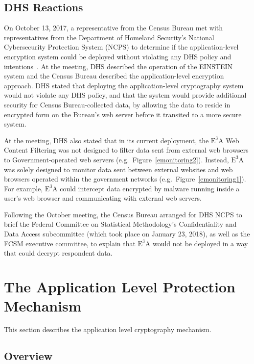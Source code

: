 \documentclass[fleqn,12pt]{wlscirep}
\newcommand{\ETA}{$\textrm{E}^\textrm{3}\textrm{A}$\xspace}
\begin{document}
\subsection{DHS Reactions}

On October 13, 2017, a representative from the Census Bureau met with
representatives from the Department of Homeland Security's National
Cybersecurity Protection System (NCPS) to determine if the
application-level encryption system could be deployed without
violating any DHS policy and intentions~\cite{garfinkel-notes}. At the meeting, DHS
described the operation of the EINSTEIN system and the Census Bureau
described the application-level encryption approach. DHS stated that
deploying the application-level cryptography system would not violate
any DHS policy, and that the system
would provide additional security for Census Bureau-collected data, by
allowing the data to reside in encrypted form on the Bureau's web
server before it transited to a more secure system.

At the meeting, DHS also stated that in its current deployment, the \ETA Web Content Filtering
was not designed to filter data sent from external web browsers to
Government-operated web servers (e.g.~Figure~\ref{emonitoring2}). Instead, \ETA was solely designed to
monitor data sent between external websites and web browsers operated
within the government networks (e.g.~Figure~\ref{emonitoring1}). For example, \ETA could intercept data
encrypted by malware running inside a user's web browser and
communicating with external web servers.

Following the October meeting, the Census Bureau arranged for DHS NCPS
to brief the Federal Committee on Statistical Methodology's
Confidentiality and Data Access subcommittee (which took place on
January 23, 2018), as well as the FCSM executive committee, to explain
that \ETA would not be deployed in a way that could decrypt respondent data.

\section{The Application Level Protection Mechanism}

This section describes the application level cryptography mechanism.

\subsection{Overview}
\end{document}
